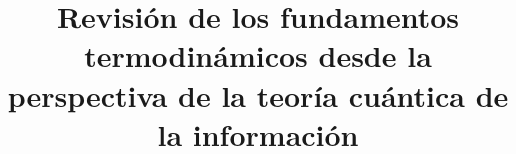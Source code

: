 \documentclass[11pt]{book}
\theoremstyle{definition}
\begin{document}









\title{Revisión de los fundamentos termodinámicos desde la perspectiva de la teoría cuántica de la información} %
\end{document}
